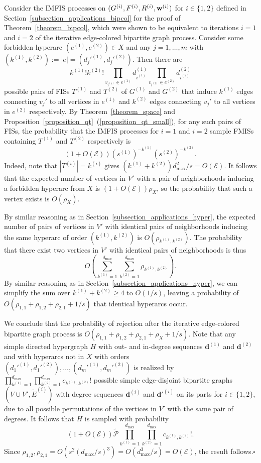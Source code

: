 \documentclass{article}
\theoremstyle{plain}
\theoremstyle{remark}
\theoremstyle{plain}
\numberwithin{equation}{section}
\renewcommand{\d}{{\boldsymbol{d}}}
\renewcommand{\b}{{\bf{w}}}
\begin{document}
	Consider the IMFIS processes on $(G^{(i)},F^{(i)},R^{(i)},\b^{(i)})$ for $i\in\{1,2\}$ defined in Section~\ref{subsection_applications_bipcol} for the proof of Theorem~\ref{theorem_bipcol}, which were shown to be equivalent to iterations $i=1$ and $i=2$ of the iterative edge-colored bipartite graph process. Consider some forbidden hyperarc $(e^{(1)},e^{(2)})\in X$ and any $j=1,\ldots,m$ with $(k^{(1)},k^{(2)}):=|e|=(d_j'^{(1)},d_j'^{(2)})$. Then there are $$k^{(1)}!k^{(2)}!\prod_{v_{i^{(1)}}\in e^{(1)}}d_{i^{(1)}}^{(1)}\prod_{v_{i^{(2)}}\in e^{(2)}}d_{i^{(2)}}^{(2)}$$ possible pairs of FISs $T^{(1)}$ and $T^{(2)}$ of $G^{(1)}$ and $G^{(2)}$ that induce $k^{(1)}$ edges connecting $v_j'$ to all vertices in $e^{(1)}$ and $k^{(2)}$ edges connecting $v_j'$ to all vertices in $e^{(2)}$ respectively. By Theorem~\ref{theorem_space} and Proposition~\ref{proposition_qt}~(\ref{proposition_qt_small}), for any such pairs of FISs, the probability that the IMFIS processes for $i=1$ and $i=2$ sample FMISs containing $T^{(1)}$ and $T^{(2)}$ respectively is $$(1+O(\mathscr{E}))(s^{(1)})^{-k^{(1)}}(s^{(2)})^{-k^{(2)}}.$$ Indeed, note that $|T^{(i)}|=k^{(i)}$ gives $(k^{(1)}+k^{(2)})d_{\max}^2/s=O(\mathscr{E})$. It follows that the expected number of vertices in $V'$ with a pair of neighborhoods inducing a forbidden hyperarc from $X$ is $(1+O(\mathscr{E}))\rho_X$, so the probability that such a vertex exists is $O(\rho_X)$.
	
	By similar reasoning as in Section~\ref{subsection_applications_hyper}, the expected number of pairs of vertices in $V'$ with identical pairs of neighborhoods inducing the same hyperarc of order $(k^{(1)},k^{(2)})$ is $O(\rho_{k^{(1)},k^{(2)}})$. The probability that there exist two vertices in $V'$ with identical pairs of neighborhoods is thus $$O\left(\sum_{k^{(1)}=1}^{d_{\max}}\sum_{k^{(2)}=1}^{d_{\max}}\rho_{k^{(1)},k^{(2)}}\right).$$ By similar reasoning as in Section~\ref{subsection_applications_hyper}, we can simplify the sum over $k^{(1)}+k^{(2)}\geq4$ to $O(1/s)$, leaving a probability of $O(\rho_{1,1}+\rho_{1,2}+\rho_{2,1}+1/s)$ that identical hyperarcs occur.
	
	We conclude that the probability of rejection after the iterative edge-colored bipartite graph process is $O(\rho_{1,1}+\rho_{1,2}+\rho_{2,1}+\rho_X+1/s)$. Note that any simple directed hypergraph $H$ with out- and in-degree sequences $\d^{(1)}$ and $\d^{(2)}$ and with hyperarcs not in $X$ with orders $(d_1'^{(1)},d_1'^{(2)}),\ldots,(d_m'^{(1)},d_m'^{(2)})$ is realized by $\prod_{k^{(1)}=1}^{d_{\max}}\prod_{k^{(2)}=1}^{d_{\max}}c_{k^{(1)},k^{(2)}}!$ possible simple edge-disjoint bipartite graphs $(V\cup V',\widetilde{E}^{(i)})$ with degree sequences $\d^{(i)}$ and $\d'^{(i)}$ on its parts for $i\in\{1,2\}$, due to all possible permutations of the vertices in $V'$ with the same pair of degrees. It follows that $H$ is sampled with probability $$(1+O(\mathscr{E}))\widetilde{\mathscr{P}}\prod_{k^{(1)}=1}^{d_{\max}}\prod_{k^{(2)}=1}^{d_{\max}}c_{k^{(1)},k^{(2)}}!.$$ Since $\rho_{1,2},\rho_{2,1}=O(s^2(d_{\max}/s)^3)=O(d_{\max}^3/s)=O(\mathscr{E})$, the result follows.\hfill$\square$
	
\end{document}
